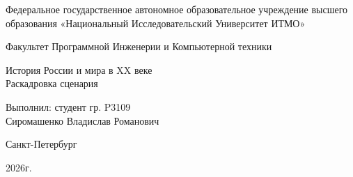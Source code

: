 \begin{center}
	Федеральное государственное автономное образовательное учреждение высшего образования «Национальный Исследовательский Университет ИТМО»
	
	\vspace{1em}
	Факультет Программной Инженерии и Компьютерной техники
	
	\vspace{20em}
	
	{\Large История России и мира в XX веке}\\[1em]
	{\Large Раскадровка сценария}\\[1em]
\end{center}

\vspace{12em}

\begin{flushright}
	Выполнил:
	студент гр. P3109\\
	Сиромашенко Владислав Романович\\
\end{flushright}
\vspace{9em}
\vspace{\fill}

\begin{center}
	Санкт-Петербург
	
	2026г.
\end{center}